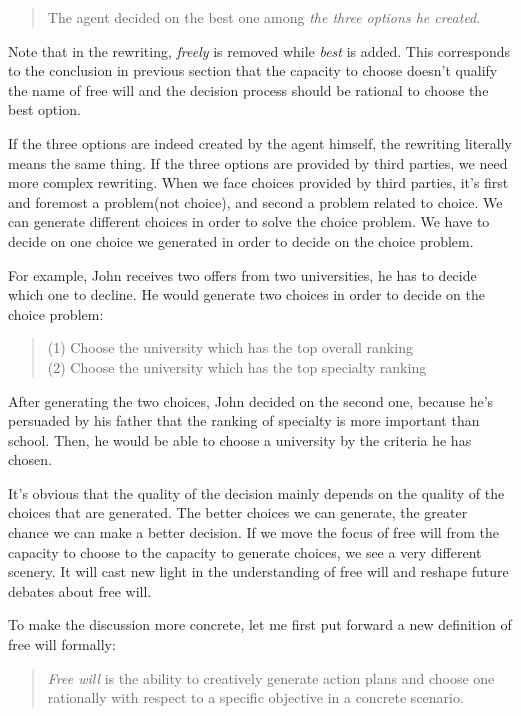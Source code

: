 \begin{quote}
  The agent decided on the best one among \emph{the three options he created}.
\end{quote}

Note that in the rewriting, \emph{freely} is removed while \emph{best} is added. This corresponds to the conclusion in previous section that the capacity to choose doesn't qualify the name of free will and the decision process should be rational to choose the best option.

If the three options are indeed created by the agent himself, the rewriting literally means the same thing. If the three options are provided by third parties, we need more complex rewriting. When we face choices provided by third parties, it's first and foremost a problem(not choice), and second a problem related to choice. We can generate different choices in order to solve the choice problem. We have to decide on one choice we generated in order to decide on the choice problem.

For example, John receives two offers from two universities, he has to decide which one to decline. He would generate two choices in order to decide on the choice problem:

\begin{quote}
(1) Choose the university which has the top overall ranking \\
(2) Choose the university which has the top specialty ranking
\end{quote}

After generating the two choices, John decided on the second one, because he's persuaded by his father that the ranking of specialty is more important than school. Then, he would be able to choose a university by the criteria he has chosen.

It's obvious that the quality of the decision mainly depends on the quality of the choices that are generated. The better choices we can generate, the greater chance we can make a better decision. If we move the focus of free will from the capacity to choose to the capacity to generate choices, we see a very different scenery. It will cast new light in the understanding of free will and reshape future debates about free will.

To make the discussion more concrete, let me first put forward a new definition of free will formally:

\begin{quote}
\emph{Free will} is the ability to creatively generate action plans and choose one rationally with respect to a specific objective in a concrete scenario.
\end{quote}

